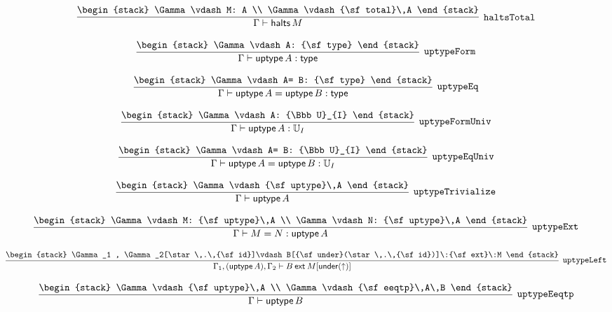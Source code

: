 \[
\infer[{\tt haltsTotal}]{\Gamma \vdash {\sf halts}\,M}{
\begin{stack}
\Gamma \vdash M: A
\\
\Gamma \vdash {\sf total}\,A
\end{stack}}
\]

\[
\infer[{\tt uptypeForm}]{\Gamma \vdash {\sf uptype}\,A: {\sf type}}{
\begin{stack}
\Gamma \vdash A: {\sf type}
\end{stack}}
\]

\[
\infer[{\tt uptypeEq}]{\Gamma \vdash {\sf uptype}\,A= {\sf uptype}\,B: {\sf type}}{
\begin{stack}
\Gamma \vdash A= B: {\sf type}
\end{stack}}
\]

\[
\infer[{\tt uptypeFormUniv}]{\Gamma \vdash {\sf uptype}\,A: {\Bbb U}_{I}}{
\begin{stack}
\Gamma \vdash A: {\Bbb U}_{I}
\end{stack}}
\]

\[
\infer[{\tt uptypeEqUniv}]{\Gamma \vdash {\sf uptype}\,A= {\sf uptype}\,B: {\Bbb U}_{I}}{
\begin{stack}
\Gamma \vdash A= B: {\Bbb U}_{I}
\end{stack}}
\]

\[
\infer[{\tt uptypeTrivialize}]{\Gamma \vdash {\sf uptype}\,A}{
\begin{stack}
\Gamma \vdash {\sf uptype}\,A
\end{stack}}
\]

\[
\infer[{\tt uptypeExt}]{\Gamma \vdash M= N: {\sf uptype}\,A}{
\begin{stack}
\Gamma \vdash M: {\sf uptype}\,A
\\
\Gamma \vdash N: {\sf uptype}\,A
\end{stack}}
\]

\[
\infer[{\tt uptypeLeft}]{\Gamma_1 ,({\sf uptype}\,A), \Gamma_2 \vdash B\:{\sf ext}\:M[{\sf under}(\uparrow )]}{
\begin{stack}
\Gamma_1 , \Gamma_2[\star \,.\,{\sf id}]\vdash B[{\sf under}(\star \,.\,{\sf id})]\:{\sf ext}\:M
\end{stack}}
\]

\[
\infer[{\tt uptypeEeqtp}]{\Gamma \vdash {\sf uptype}\,B}{
\begin{stack}
\Gamma \vdash {\sf uptype}\,A
\\
\Gamma \vdash {\sf eeqtp}\,A\,B
\end{stack}}
\]

